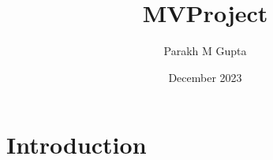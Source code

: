 \documentclass{article}
\title{MVProject}
\author{Parakh M Gupta}
\date{December 2023}
\begin{document}
\maketitle

\section{Introduction}
\end{document}
